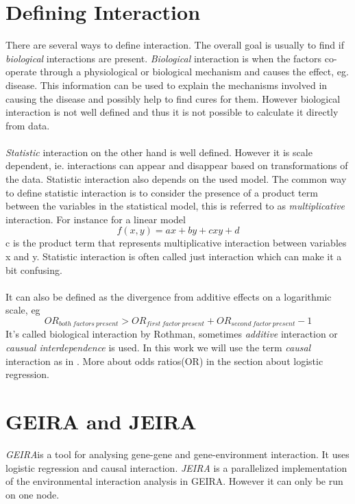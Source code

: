 \documentclass[10pt,a4paper]{report}
\begin{document}
\section{Defining Interaction}
There are several ways to define interaction. The overall goal is usually to find if \emph{biological} interactions are present. \emph{Biological} interaction is when the factors co-operate through a physiological or biological mechanism and causes the effect, eg. disease. This information can be used to explain the mechanisms involved in causing the disease and possibly help to find cures for them. However biological interaction is not well defined and thus it is not possible to calculate it directly from data.\cite{rothman1998modern,rothman2002intro_epidemiology}\\
\\
\emph{Statistic} interaction on the other hand is well defined. However it is scale dependent, ie. interactions can appear and disappear based on transformations of the data. Statistic interaction also depends on the used model. The common way to define statistic interaction is to consider the presence of a product term between the variables in the statistical model, this is referred to as \emph{multiplicative} interaction. For instance for a linear model
\begin{equation}
f(x,y)=ax+by+cxy+d
\end{equation}
c is the product term that represents multiplicative interaction between variables x and y. Statistic interaction is often called just interaction which can make it a bit confusing.\cite{geira,rothman1998modern}\\
\\
It can also be defined as the divergence from additive effects on a logarithmic scale, eg
\begin{equation}
OR_{both\:factors\:present}>OR_{first\:factor\:present}+OR_{second\:factor\:present}-1
\end{equation}
It's called biological interaction by Rothman\cite{rothman1998modern}, sometimes \emph{additive} interaction\cite{geira} or \emph{causual interdependence}\cite{greenland1988invariants} is used. In this work we will use the term \emph{causal} interaction as in \cite{causal_bounds_arvid}. More about odds ratios(OR) in the section about logistic regression.\\

\section{GEIRA and JEIRA}
\emph{GEIRA}is a tool for analysing gene-gene and gene-environment interaction. It uses logistic regression and causal interaction\cite{geira}. \emph{JEIRA} is a parallelized implementation of the environmental interaction analysis in GEIRA. However it can only be run on one node.
\end{document}
